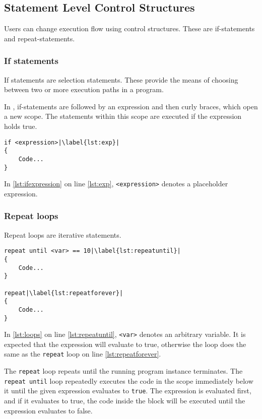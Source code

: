 \subsection{Statement Level Control Structures}
Users can change execution flow using control structures. These are if-statements and repeat-statements.
\subsubsection{If statements}
If statements are selection statements. These provide the means of choosing between two or more execution paths in a program\cite{sebesta_concepts_2016}.

In \dazel{}, if-statements are followed by an expression and then curly braces, which open a new scope. The statements within this scope are executed if the expression holds true.

\begin{lstlisting}[caption={Example of an if statement}, label={lst:ifexpression},escapechar=|]
if <expression>|\label{lst:exp}|
{
    Code...
}
\end{lstlisting}

In \ref{lst:ifexpression} on line \ref{lst:exp},  \verb|<expression>| denotes a placeholder expression.

\subsubsection{Repeat loops}
Repeat loops are iterative statements.

\begin{lstlisting}[caption={Example of loops}, label={lst:loops},escapechar=|]
repeat until <var> == 10|\label{lst:repeatuntil}|
{
    Code...
}

repeat|\label{lst:repeatforever}|
{
    Code...
}
\end{lstlisting}

In \ref{lst:loops} on line \ref{lst:repeatuntil}, \verb|<var>| denotes an arbitrary variable. It is expected that the expression will evaluate to true, otherwise the loop does the same as the \verb|repeat| loop on line \ref{lst:repeatforever}.

The \verb|repeat| loop repeats until the running program instance terminates.
The \verb|repeat until| loop repeatedly executes the code in the scope immediately below it until the given expression evaluates to \verb|true|.
The expression is evaluated first, and if it evaluates to true, the code inside the block will be executed until the expression evaluates to false.